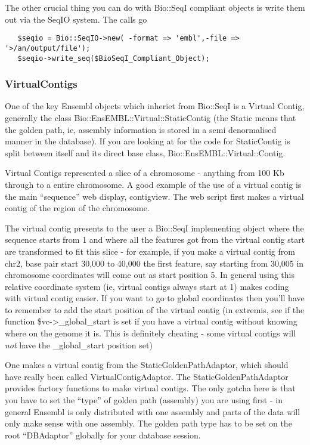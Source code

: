 \documentclass[11pt,a4paper]{article}
\begin{document}
The other crucial thing you can do with Bio::SeqI compliant objects is write them out
via the SeqIO system. The calls go

\begin{verbatim}
   $seqio = Bio::SeqIO->new( -format => 'embl',-file => '>/an/output/file');
   $seqio->write_seq($BioSeqI_Compliant_Object);
\end{verbatim}

\subsubsection{VirtualContigs}

One of the key Ensembl objects which inheriet from Bio::SeqI is a
Virtual Contig, generally the class
Bio::EnsEMBL::Virtual::StaticContig (the Static means that the golden
path, ie, assembly information is stored in a semi denormalised manner
in the database). If you are looking at for the code for StaticContig
is split between itself and its direct base class,
Bio::EnsEMBL::Virtual::Contig.

Virtual Contigs represented a slice of a chromosome - anything from 
100 Kb through to a entire chromosome. A good example of the use of
a virtual contig is the main ``sequence'' web display, contigview. The web 
script first makes a virtual contig of the region of the chromosome.


The virtual contig presents to the user a Bio::SeqI implementing
object where the sequence starts from 1 and where all the features got
from the virtual contig start are transformed to fit this slice - for
example, if you make a virtual contig from chr2, base pair start
30,000 to 40,000 the first feature, say starting from 30,005 in
chromosome coordinates will come out as start position 5. In general
using this relative coordinate system (ie, virtual contigs always
start at 1) makes coding with virtual contig easier. If you want to go
to global coordinates then you'll have to remember to add the start
position of the virtual contig (in extremis, see if the function
\$vc->\_global\_start is set if you have a virtual contig without
knowing where on the genome it is. This is definitely cheating - some
virtual contigs will \emph{not} have the \_global\_start position set)


One makes a virtual contig from the StaticGoldenPathAdaptor, which should
have really been called VirtualContigAdaptor. The StaticGoldenPathAdaptor 
provides factory functions to make virtual contigs. The only gotcha here is
that you have to set the ``type'' of golden path (assembly) you are using
first - in general Ensembl is only distributed with one assembly and parts
of the data will only make sense with one assembly. The golden path type
has to be set on the root ``DBAdaptor'' globally for your database session.
\end{document}
